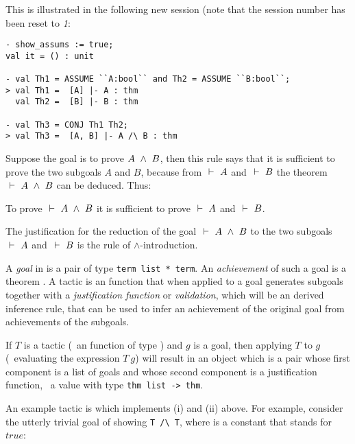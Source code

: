 \noindent  This  is   illustrated  in  the
following new session (note that the session number has been reset to
{\small\sl 1}:

\setcounter{sessioncount}{0}
\begin{session}\begin{verbatim}
- show_assums := true;
val it = () : unit

- val Th1 = ASSUME ``A:bool`` and Th2 = ASSUME ``B:bool``;
> val Th1 =  [A] |- A : thm
  val Th2 =  [B] |- B : thm

- val Th3 = CONJ Th1 Th2;
> val Th3 =  [A, B] |- A /\ B : thm
\end{verbatim}\end{session}

    Suppose the goal is to prove $A\ \wedge\  B$, then this rule says that
    it is sufficient to prove the two subgoals $A$ and $B$, because
    from $\ \vdash\  A$ and $\ \vdash\  B$ the theorem $\ \vdash\  A\ \wedge\  B$ can be
    deduced. Thus:

\begin{myenumerate}
\item To prove $\ \vdash\  A \ \wedge\  B$ it is sufficient to
      prove $\ \vdash\  A$ and $\ \vdash\  B$.
\item The justification for the reduction of the
goal  $\ \vdash\  A \ \wedge\  B$  to the two  subgoals  $\ \vdash\  A$
and $\ \vdash\  B$ is the rule of $\wedge$-introduction.
\end{myenumerate}

A {\it goal\/} in \HOL{} is a pair  of
\ML{} type {\small\verb|term list * term|}. An {\it achievement\/} of
such a goal is a theorem .  A tactic
is an \ML{} function that when applied to a goal generates subgoals
together with a {\it justification function\/} or {\it validation\/},
which will be an \ML{} derived inference rule, that can be used to
infer an achievement of the original goal from achievements of the
subgoals.

If $T$ is a tactic (\ie\ an \ML{} function of type ) and $g$ is a goal, then applying $T$ to
$g$ (\ie\ evaluating the \ML{} expression $T\ g$) will result in an
object which is a pair whose first component is a list of goals and
whose second component is a justification function, \ie\ a value with
\ML{} type {\small\verb|thm list -> thm|}.

An example tactic is  which implements (i) and (ii)
above.  For example, consider the utterly trivial goal of showing
{\small\verb|T /\ T|}, where  is a constant that stands for
$true$:

